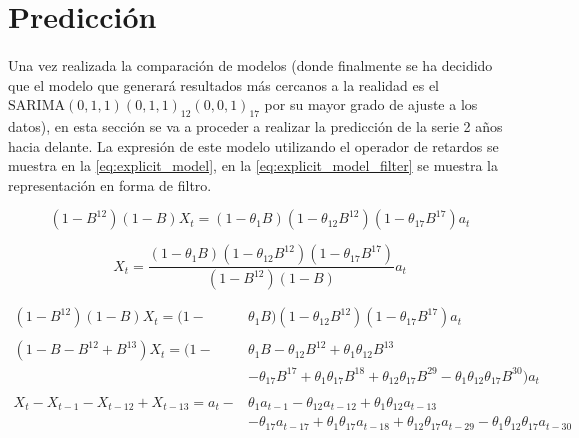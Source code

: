 \documentclass[a4paper, spanish]{article}
\begin{document}
  \section{Predicción}
  \label{sec:prediction}

    \paragraph{}
    Una vez realizada la comparación de modelos (donde finalmente se ha decidido que el modelo que generará resultados más cercanos a la realidad es el \textbf{$\text{SARIMA}(0, 1, 1)(0, 1, 1)_{12}(0, 0, 1)_{17}$} por su mayor grado de ajuste a los datos), en esta sección se va a proceder a realizar la predicción de la serie 2 años hacia delante. La expresión de este modelo utilizando el operador de retardos se muestra en la \autoref{eq:explicit_model}, en la \autoref{eq:explicit_model_filter} se muestra la representación en forma de filtro.

    \begin{equation}
    \label{eq:explicit_model}
      (1 - B^{12})(1 - B)X_t = (1 - \theta_{1}B)(1 - \theta_{12}B^{12})(1 - \theta_{17}B^{17})a_t
    \end{equation}

    \begin{equation}
    \label{eq:explicit_model_filter}
      X_t = \frac{(1 - \theta_{1}B)(1 - \theta_{12}B^{12})(1 - \theta_{17}B^{17})}{(1 - B^{12})(1 - B)}a_t
    \end{equation}

    \begin{align*}
      (1 - B^{12})(1 - B)X_t = (1 - &\theta_{1}B)(1 - \theta_{12}B^{12})(1 - \theta_{17}B^{17})a_t \\ \\
      (1 - B - B^{12} + B^{13})X_t = (1 - &\theta_{1}B - \theta_{12}B^{12} + \theta_{1}\theta_{12}B^{13} \\
      &- \theta_{17}B^{17} + \theta_{1}\theta_{17}B^{18} + \theta_{12}\theta_{17}B^{29} - \theta_{1}\theta_{12}\theta_{17}B^{30})a_t \\ \\
      X_t - X_{t - 1} - X_{t - 12} + X_{t - 13} = a_t - &\theta_{1}a_{t - 1} - \theta_{12}a_{t - 12} + \theta_{1}\theta_{12}a_{t - 13} \\
      &- \theta_{17}a_{t - 17} + \theta_{1}\theta_{17}a_{t - 18} + \theta_{12}\theta_{17}a_{t - 29} - \theta_{1}\theta_{12}\theta_{17}a_{t - 30}
    \end{align*}
\end{document}
